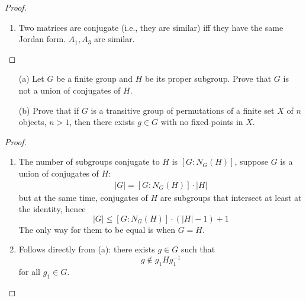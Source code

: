 \documentclass[openany]{book}
\begin{document}
\begin{proof}
\begin{enumerate}
        \item Two matrices are conjugate (i.e., they are similar) iff they have the same Jordan form. $A_1,A_3$ are similar.
    \end{enumerate}
\end{proof}




\begin{prob}
    \begin{itemize}
        \item[(a)] Let \(G\) be a finite group and \(H\) be its proper subgroup. Prove that \(G\) is not a union of conjugates of \(H\).
        
        \item[(b)] Prove that if \(G\) is a transitive group of permutations of a finite set \(X\) of \(n\) objects, \(n > 1\), then there exists \(g \in G\) with no fixed points in \(X\).
    \end{itemize}
\end{prob}
\begin{proof}
    \begin{enumerate}
        \item The number of subgroups conjugate to $H$ is $[G:N_G(H)]$, suppose $G$ is a union of conjugates of $H$: 
        \begin{align*}
            |G|=[G: N_G(H)]\cdot |H|
        \end{align*}
        but at the same time, conjugates of $H$ are subgroups that intersect at least at the identity, hence 
        \begin{equation*}
            |G|\leq [G:N_G(H)]\cdot(|H|-1)+1
        \end{equation*}
        The only way for them to be equal is when $G=H$.
        \item Follows directly from (a): there exists $g\in G$ such that 
        \begin{equation*}
            g\not\in g_1Hg_1^{-1}
        \end{equation*}
        for all $g_1\in G$.
    \end{enumerate}
\end{proof}
\end{document}
